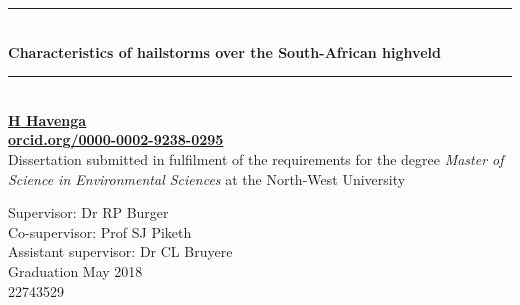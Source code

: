 
\begin{titlepage}
\begingroup
{\selectfont 


\newcommand{\HRule}{\rule{\linewidth}{0.0mm}} %
\center %

\HRule \\[0.5cm]
{\fontsize{32}{10}\selectfont \bfseries Characteristics of hailstorms
over the South-African highveld}\\[0.2cm] 
\HRule \\[1.25cm]

{\huge \bfseries \href{www.hennohavenga.com}{H Havenga}} \\[0.2cm]
{\huge \bfseries
\href{https://orcid.org/0000-0002-9238-0295}{orcid.org/0000-0002-9238-0295}}
\\[2.20cm]

{\LARGE Dissertation submitted in fulfilment of the requirements for
the degree {\color{cyan!85} \textit{Master of Science in Environmental
Sciences}} at the North-West University}\\[1.70cm]

\raggedright 
\LARGE Supervisor: \hspace{24mm} Dr RP Burger \\
\LARGE Co-supervisor: \hspace{16mm} Prof SJ Piketh \\
\LARGE Assistant supervisor: \hspace{1.4mm} Dr CL Bruyere\\[1.5cm]

\LARGE Graduation May 2018\\
\LARGE 22743529\\

\vspace*{2cm}
\noindent
\begin{center}
\end{center}

}
\endgroup
\end{titlepage}

\restoregeometry
